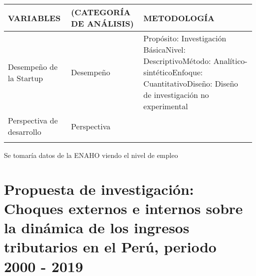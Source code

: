 \documentclass[
  man,
  floatsintext,
  longtable,
  a4paper,
  nolmodern,
  notxfonts,
  notimes,
  colorlinks=true,linkcolor=blue,citecolor=blue,urlcolor=blue]{apa7}
\begin{document}
\begin{longtable}[]{@{}
  >{\raggedright\arraybackslash}p{}
  >{\raggedright\arraybackslash}p{}
  >{\raggedright\arraybackslash}p{}@{}}
\toprule\noalign{}
\begin{minipage}[b]{\linewidth}\raggedright
VARIABLES
\end{minipage} & \begin{minipage}[b]{\linewidth}\raggedright
(CATEGORÍA DE ANÁLISIS)
\end{minipage} & \begin{minipage}[b]{\linewidth}\raggedright
METODOLOGÍA
\end{minipage} \\
\midrule\noalign{}
\endhead
\bottomrule\noalign{}
\endlastfoot
Desempeño de la Startup & Desempeño & Propósito: Investigación
BásicaNivel: DescriptivoMétodo: Analítico-sintéticoEnfoque:
CuantitativoDiseño: Diseño de investigación no experimental \\
Perspectiva de desarrollo & Perspectiva & \\
& & \\
\end{longtable}

Se tomaría datos de la ENAHO viendo el nivel de empleo

\section{Propuesta de investigación: Choques externos e internos sobre
la dinámica de los ingresos tributarios en el Perú, periodo 2000 -
2019}\label{propuesta-de-investigaciuxf3n-choques-externos-e-internos-sobre-la-dinuxe1mica-de-los-ingresos-tributarios-en-el-peruxfa-periodo-2000---2019}
\end{document}

